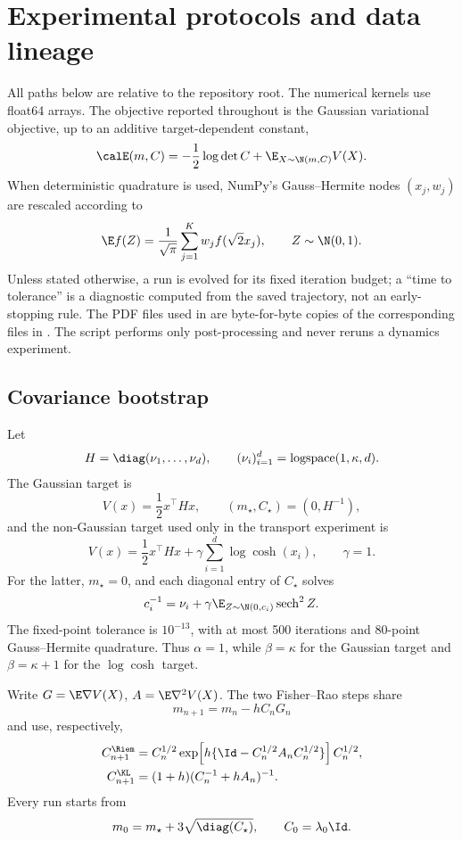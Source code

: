 \section{Experimental protocols and data lineage}
\label{app:experiments}

All paths below are relative to the repository root.  The numerical kernels use
float64 arrays.  The objective reported throughout is the Gaussian variational
objective, up to an additive target-dependent constant,
\[
  \calE(m,C)
  =-\frac12\log\det C+\E_{X\sim\N(m,C)}V(X).
\]
When deterministic quadrature is used, NumPy's Gauss--Hermite nodes
\((x_j,w_j)\) are rescaled according to
\[
  \E f(Z)=\frac1{\sqrt\pi}\sum_{j=1}^{K}w_j f(\sqrt2x_j),
  \qquad Z\sim\N(0,1).
\]
Unless stated otherwise, a run is evolved for its fixed iteration budget; a
``time to tolerance'' is a diagnostic computed from the saved trajectory, not
an early-stopping rule.  The PDF files used in  are
byte-for-byte copies of the corresponding files in
.  The script
 performs only post-processing and never
reruns a dynamics experiment.

\subsection{Covariance bootstrap}

Let
\[
  H=\diag(\nu_1,\ldots,\nu_d),
  \qquad (\nu_i)_{i=1}^d=\operatorname{logspace}(1,\kappa,d).
\]
The Gaussian target is
\[
  V(x)=\frac12x^\top Hx,
  \qquad (m_\star,C_\star)=(0,H^{-1}),
\]
and the non-Gaussian target used only in the transport experiment is
\[
  V(x)=\frac12x^\top Hx+\gamma\sum_{i=1}^d\log\cosh(x_i),
  \qquad \gamma=1.
\]
For the latter, \(m_\star=0\), and each diagonal entry of \(C_\star\) solves
\[
  c_i^{-1}=\nu_i+\gamma\E_{Z\sim\N(0,c_i)}\operatorname{sech}^2 Z.
\]
The fixed-point tolerance is \(10^{-13}\), with at most 500 iterations and
80-point Gauss--Hermite quadrature.  Thus \(\alpha=1\), while
\(\beta=\kappa\) for the Gaussian target and \(\beta=\kappa+1\) for the
\(\log\cosh\) target.

Write \(G=\E\nabla V(X)\), \(A=\E\nabla^2V(X)\).  The two Fisher--Rao steps
share
\[
  m_{n+1}=m_n-hC_nG_n
\]
and use, respectively,
\begin{align*}
  C_{n+1}^{\Riem}
  &=C_n^{1/2}\exp\!\left[h\{\Id-C_n^{1/2}A_nC_n^{1/2}\}\right]C_n^{1/2},\\
  C_{n+1}^{\KL}
  &=(1+h)(C_n^{-1}+hA_n)^{-1}.
\end{align*}
Every run starts from
\[
  m_0=m_\star+3\sqrt{\diag(C_\star)},
  \qquad C_0=\lambda_0\Id.
\]

